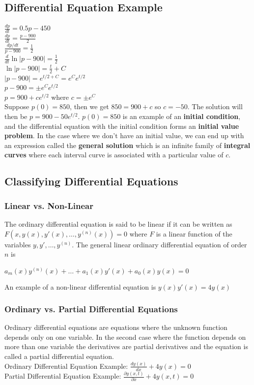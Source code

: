 \documentclass{article}
\begin{document}
\subsection{Differential Equation Example}
$\frac{dp}{dt}=0.5p-450$\\
$\frac{dp}{dt}=\frac{p-900}{2}$\\
$\frac{dp/dt}{p-900}=\frac{1}{2}$\\
$\frac{d}{dt}\ln \vert p-900\vert=\frac{1}{2}$\\
$\ln \vert p-900\vert = \frac{t}{2}+C$\\
$\vert p-900\vert=e^{t/2 + C}=e^Ce^{t/2}$\\
$p-900=\pm e^Ce^{t/2}$\\
$p=900+ce^{t/2}$ where $c=\pm e^C$\\
\newline
Suppose $p(0)=850$, then we get $850=900+c$ so $c=-50$. The solution will then be $p=900-50e^{t/2}$. $p(0)=850$ is an example of an \textbf{initial condition}, and the differential equation with the initial condition forms an \textbf{initial value problem}. In the case where we don't have an initial value, we can end up with an expression called the \textbf{general solution} which is an infinite family of \textbf{integral curves} where each interval curve is associated with a particular value of $c$.
\subsection{Classifying Differential Equations}
\subsubsection{Linear vs. Non-Linear}
The ordinary differential equation is said to be linear if it can be written as $F(x,y(x),y'(x),\dots,y^{(n)}(x))=0$ where $F$ is a linear function of the variables $y,y',\dots,y^{(n)}$. The general linear ordinary differential equation of order $n$ is
\begin{center}
    $a_m(x)y^{(n)}(x)+\dots+a_1(x)y'(x)+a_0(x)y(x)=0$
\end{center}
An example of a non-linear differential equation is $y(x)y'(x)=4y(x)$
\newpage
\subsubsection{Ordinary vs. Partial Differential Equations}
Ordinary differential equations are equations where the unknown function depends only on one variable. In the second case where the function depends on more than one variable the derivatives are partial derivatives and the equation is called a partial differential equation.\\
Ordinary Differential Equation Example: $\frac{dy(x)}{dx}+4y(x)=0$\\
Partial Differential Equation Example: $\frac{\partial y(x,t)}{\partial x}+4y(x,t)=0$
\end{document}
